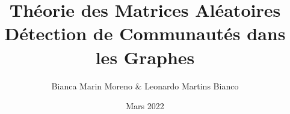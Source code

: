 \documentclass[11pt]{article}
\title{Théorie des Matrices Aléatoires \\ Détection de Communautés dans les Graphes}
\author{Bianca Marin Moreno \& Leonardo Martins Bianco}
\date{Mars 2022}  %
\begin{document}
\maketitle





\clearpage  %
\nocite{*}  %


\end{document}
